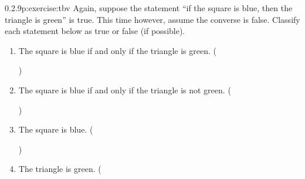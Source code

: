 \documentclass[twoside,11pt,]{book}
\numberwithin{equation}{chapter}
\begin{document}
\begin{divisionsolution}{0.2.9}{}{p:exercise:tbv}%
Again, suppose the statement ``if the square is blue, then the triangle is green'' is true. This time however, assume the converse is false. Classify each statement below as true or false (if possible).%
\begin{enumerate}[label=(\alph*)]
\item{}The square is blue if and only if the triangle is green. \quad()\quad
%
\item{}The square is blue if and only if the triangle is not green. \quad()\quad
%
\item{}The square is blue. \quad()\quad
%
\item{}The triangle is green. \quad(
\end{enumerate}
\end{divisionsolution}
\end{document}
